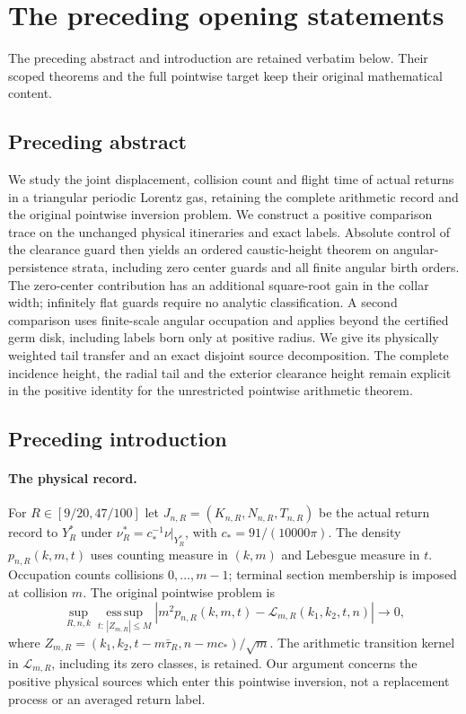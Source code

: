 \section{The preceding opening statements}
\label{app:v70-retained-front}
The preceding abstract and introduction are retained verbatim below.
Their scoped theorems and the full pointwise target keep their original
mathematical content.
\subsection*{Preceding abstract}

We study the joint displacement, collision count and flight time of
actual returns in a triangular periodic Lorentz gas, retaining the
complete arithmetic record and the original pointwise inversion
problem. We construct a positive comparison trace on the unchanged
physical itineraries and exact labels. Absolute control of the
clearance guard then yields an ordered caustic-height theorem on
angular-persistence strata, including zero center guards and all
finite angular birth orders. The zero-center contribution has an
additional square-root gain in the collar width; infinitely flat
guards require no analytic classification. A second comparison uses
finite-scale angular occupation and applies beyond the certified
germ disk, including labels born only at positive radius. We give
its physically weighted tail transfer and an exact disjoint
source decomposition. The complete incidence height, the radial
tail and the exterior clearance height remain explicit in the
positive identity for the unrestricted pointwise arithmetic theorem.

\subsection*{Preceding introduction}


\paragraph{The physical record.}
For $R\in[9/20,47/100]$ let
$J_{n,R}=(K_{n,R},N_{n,R},T_{n,R})$ be the actual return record
to $Y_R^*$ under $\nu_R^*=c_*^{-1}\nu|_{Y_R^*}$, with
$c_*=91/(10000\pi)$. The density $p_{n,R}(k,m,t)$ uses counting
measure in $(k,m)$ and Lebesgue measure in $t$. Occupation counts
collisions $0,\ldots,m-1$; terminal section membership is imposed
at collision $m$. The original pointwise problem is
\begin{equation}\label{eq:intro-v69-pointwise-target}
 \sup_{R,n,k}\operatorname*{ess\,sup}_{t:\,|Z_{m,R}|\le M}
 \left|m^2p_{n,R}(k,m,t)-\mathcal L_{m,R}(k_1,k_2,t,n)\right|
                                      \longrightarrow0,
\end{equation}
where $Z_{m,R}=(k_1,k_2,t-m\bar\tau_R,n-mc_*)/\sqrt m$.
The arithmetic transition kernel in $\mathcal L_{m,R}$, including
its zero classes, is retained. Our argument concerns the positive
physical sources which enter this pointwise inversion, not a
replacement process or an averaged return label.

